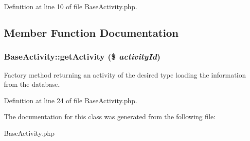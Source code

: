 Definition at line 10 of file Base\-Activity.php.

\subsection{Member Function Documentation}
\subsubsection{\setlength{\rightskip}{0pt plus 5cm}Base\-Activity::get\-Activity (\$ {\em activity\-Id})}\label{classBaseActivity_a0}


Factory method returning an activity of the desired type loading the information from the database. 

Definition at line 24 of file Base\-Activity.php.

The documentation for this class was generated from the following file:\begin{CompactItemize}
\item 
Base\-Activity.php\end{CompactItemize}
